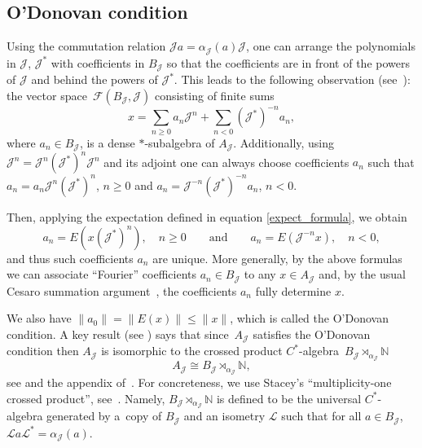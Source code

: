 \documentclass[pdftex]{sigma}
\newcommand{\N}{{\mathbb N}}
\newcommand{\jcal}{{\mathcal J}}
\newcommand{\fancyJ}{\mathcal{J}}
\newcommand{\fancyL}{\mathcal{L}}
\numberwithin{equation}{section}
\begin{document}
\subsection{O'Donovan condition}
Using the commutation relation
${\mathcal{J}} a=\alpha_\jcal(a){\mathcal{J}}$,
one can arrange the polynomials in ${\mathcal{J}}$, ${\mathcal{J}}^*$ with coefficients in $B_\jcal$ so that the coefficients are in front of the powers of ${\mathcal{J}}$ and behind the powers of ${\mathcal{J}}^*$. This leads to the following observation (see~\cite[Proposition~2.3]{LO}):
the vector space~$\mathcal{F}(B_\jcal,{\mathcal{J}})$ consisting of finite sums
\begin{equation}\label{FourierV}
x=\sum_{n\ge0}a_n {\mathcal{J}}^n + \sum_{n<0}({\mathcal{J}}^*)^{-n} a_n ,
\end{equation}
where $a_n\in B_\jcal$, is a dense $*$-subalgebra of $A_{\mathcal{J}}$.
Additionally, using ${\mathcal{J}}^n = {\mathcal{J}}^n({\mathcal{J}}^*)^n{\mathcal{J}}^n$ and its adjoint
one can always choose coefficients $a_n$ such that
$
a_n=a_n{\mathcal{J}}^n({\mathcal{J}}^*)^n$, $ n\geq 0 $ and $ a_n={\mathcal{J}}^{-n}({\mathcal{J}}^*)^{-n}a_n$, $ n<0$.

Then, applying the expectation defined in equation \eqref{expect_formula}, we obtain
\begin{equation}\label{ancoeff}
a_n=E(x({\mathcal{J}}^*)^n) ,\quad n\geq 0\qquad \textrm{and}\qquad a_n=E({\mathcal{J}}^{-n}x),\quad n<0,
\end{equation}
and thus such coefficients $a_n$ are unique. More generally, by the above formulas we can associate ``Fourier'' coefficients $a_n\in B_\jcal$ to any $x\in A_\jcal$ and, by the usual Cesaro summation argument~\cite{K}, the coefficients $a_n$ fully determine $x$.

We also have
$\|a_0\|=\|E(x)\|\leq \|x\|$,
which is called the O'Donovan condition.
A key result (see \cite[Theorem~2.7]{LO}) says that since~$A_{\mathcal{J}}$ satisfies the O'Donovan condition then $A_{\mathcal{J}}$ is isomorphic to the crossed product $C^*$-algebra~${B_\jcal\rtimes_{\alpha_\jcal}\N}$
\begin{equation}\label{AJCross}
A_{\mathcal{J}}\cong B_\jcal\rtimes_{\alpha_\jcal}\N,
\end{equation}
see \cite{BKR} and the appendix of~\cite{HKMP2}. For concreteness, we use Stacey's ``multiplicity-one crossed product'', see~\cite{BKR}. Namely,
$B_\fancyJ \rtimes_{\alpha_\fancyJ} \N$ is defined to be the universal $C^*$-algebra generated by a~copy of $B_\fancyJ$ and an isometry $\fancyL$ such that for all $a\in B_\fancyJ$,
$
\fancyL a \fancyL^* = \alpha_\fancyJ(a)$.
\end{document}
